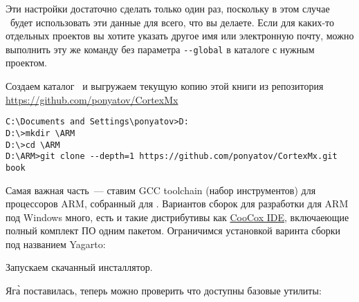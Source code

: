 \bigskip
Эти настройки достаточно сделать только один раз, поскольку в этом случае 
\git\ будет использовать эти данные для всего, что вы делаете.
 Если для каких-то отдельных проектов вы хотите указать другое имя или
электронную почту, можно выполнить эту же команду без параметра \verb|--global|
в каталоге с нужным проектом.

\bigskip
Создаем каталог \ и выгружаем текущую копию этой книги из репозитория
\url{https://github.com/ponyatov/CortexMx}

\bigskip{}

\bigskip
\begin{lstlisting}[style=con]
C:\Documents and Settings\ponyatov>D:
D:\>mkdir \ARM
D:\>cd \ARM
D:\ARM>git clone --depth=1 https://github.com/ponyatov/CortexMx.git book
\end{lstlisting}

\bigskip
Самая важная часть\ --- ставим GCC toolchain (набор инструментов)
для процессоров ARM, собранный для .
Вариантов сборок для разработки для ARM под Windows много, есть и такие
дистрибутивы как \href{http://www.coocox.org/}{CooCox IDE}, включаеющие полный
комплект ПО одним пакетом. Ограничимся установкой варинта сборки под названием
Yagarto:

\bigskip{}

\bigskip
Запускаем скачанный инсталлятор.

\bigskip{}

\bigskip{}

\bigskip{}

\bigskip{}

\bigskip{}

\bigskip{}

\bigskip Яг\`{а} поставилась, теперь можно проверить что доступны базовые 
утилиты:


